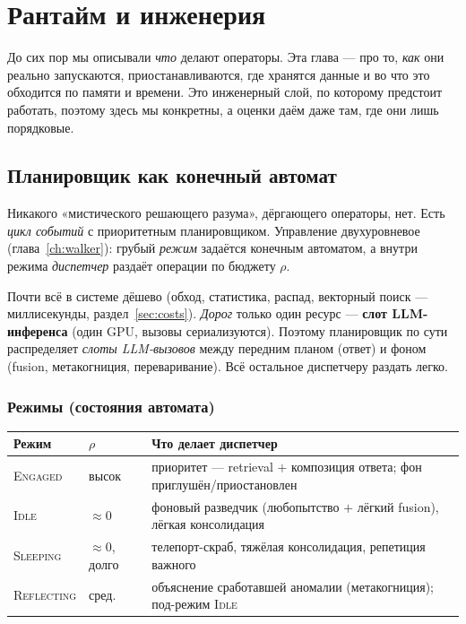 \chapter{Рантайм и инженерия}
\label{ch:runtime}

До сих пор мы описывали \emph{что} делают операторы. Эта глава — про то, \emph{как}
они реально запускаются, приостанавливаются, где хранятся данные и во что это
обходится по памяти и времени. Это инженерный слой, по которому предстоит работать,
поэтому здесь мы конкретны, а оценки даём даже там, где они лишь порядковые.

\section{Планировщик как конечный автомат}
\label{sec:scheduler}

Никакого «мистического решающего разума», дёргающего операторы, нет. Есть
\emph{цикл событий} с приоритетным планировщиком. Управление двухуровневое
(глава~\ref{ch:walker}): грубый \emph{режим} задаётся конечным автоматом, а внутри
режима \emph{диспетчер} раздаёт операции по бюджету $\rho$.

\begin{definition}
Почти всё в системе дёшево (обход, статистика, распад, векторный поиск — миллисекунды,
раздел~\ref{sec:costs}). \emph{Дорог} только один ресурс — \textbf{слот
LLM-инференса} (один GPU, вызовы сериализуются). Поэтому планировщик по сути
распределяет \emph{слоты LLM-вызовов} между передним планом (ответ) и фоном
(fusion, метакогниция, переваривание). Всё остальное диспетчеру раздать легко.
\end{definition}

\subsection{Режимы (состояния автомата)}

\begin{center}
\begin{tabular}{p{} p{} p{}}
\toprule
\textbf{Режим} & $\rho$ & \textbf{Что делает диспетчер} \\
\midrule
\textsc{Engaged} & высок & приоритет — retrieval $+$ композиция ответа; фон приглушён/приостановлен \\
\textsc{Idle} & $\approx 0$ & фоновый разведчик (любопытство $+$ лёгкий fusion), лёгкая консолидация \\
\textsc{Sleeping} & $\approx 0$, долго & телепорт-скраб, тяжёлая консолидация, репетиция важного \\
\textsc{Reflecting} & сред. & объяснение сработавшей аномалии (метакогниция); под-режим \textsc{Idle} \\
\bottomrule
\end{tabular}
\end{center}

